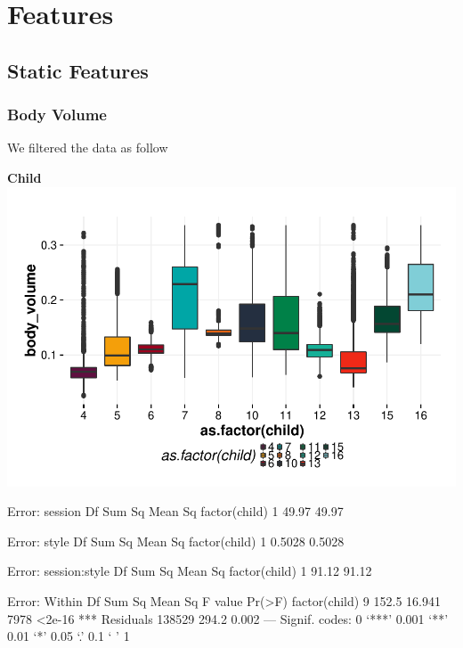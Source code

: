\documentclass{article}
\begin{document}
\section{Features}



\subsection{Static Features}
\subsubsection{Body Volume}
We filtered the data as follow


\textbf{Child}
\includegraphics{features-plot_body_volume_child_quiz}

\begin{Schunk}
\begin{Soutput}
Error: session
              Df Sum Sq Mean Sq
factor(child)  1  49.97   49.97

Error: style
              Df Sum Sq Mean Sq
factor(child)  1 0.5028  0.5028

Error: session:style
              Df Sum Sq Mean Sq
factor(child)  1  91.12   91.12

Error: Within
                  Df Sum Sq Mean Sq F value Pr(>F)    
factor(child)      9  152.5  16.941    7978 <2e-16 ***
Residuals     138529  294.2   0.002                   
---
Signif. codes:  0 ‘***’ 0.001 ‘**’ 0.01 ‘*’ 0.05 ‘.’ 0.1 ‘ ’ 1
\end{Soutput}
\end{Schunk}
\end{document}
